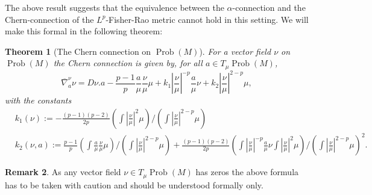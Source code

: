 \documentclass[11pt]{amsart}
\newtheorem{theorem}{Theorem}[section]
\theoremstyle{definition}
\newtheorem{remark}[theorem]{Remark}
\newcommand{\Abs}[1]{\left|#1\right|}
\newcommand{\Prob}{\operatorname{Prob}(M)}
\newcommand{\nablabar}{\overline{\nabla}}
\begin{document}
The above result suggests that the equivalence between the $\alpha$-connection and the Chern-connection of the $L^p$-Fisher-Rao metric cannot hold in this setting. We will make this formal in the following theorem:
\begin{theorem}[The Chern connection on $\Prob$]\label{thm:chern_prob}
    For a vector field $\nu$ on $\Prob$ the Chern connection is given by, for all $a\in T_\mu\Prob$,
    \begin{equation}\label{chern-prob}
    \nablabar^\nu_a\nu=D \nu.a-\frac{p-1}{p}\frac{a}{\mu}\frac{\nu}{\mu}\mu + k_1\Abs{\frac{\nu}{\mu}}^{-p}\frac{a}{\mu}\nu + k_2\Abs{\frac{\nu}{\mu}}^{2-p}\mu,
    \end{equation}
    with the constants
    \begin{align*}
    &k_1(\nu):=-\frac{(p-1)(p-2)}{2p}\left(\int\Abs{\frac{\nu}{\mu}}^2\mu\right) / \left(\int\Abs{\frac{\nu}{\mu}}^{2-p}\mu\right)\\
    &k_2(\nu,a):=\frac{p-1}{p}\left(\int\frac{a}{\mu}\frac{\nu}{\mu}\mu\right)/\left(\int \Abs{\frac{\nu}{\mu}}^{2-p}\mu\right) + \frac{(p-1)(p-2)}{2p}\left(\int\Abs{\frac{\nu}{\mu}}^{-p}\frac{a}{\mu}\nu\int \Abs{\frac{\nu}{\mu}}^{2}\mu \right)/\left(\int \Abs{\frac{\nu}{\mu}}^{2-p}\mu\right)^2.
    \end{align*}
\end{theorem}
\begin{remark}
As any vector field $\nu\in T_\mu\Prob$ has zeros the above formula has to be taken with caution and should be understood formally only. 
\end{remark}
\end{document}
